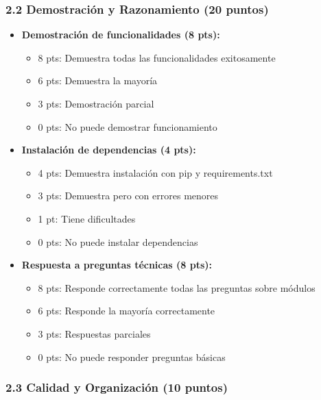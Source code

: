 \documentclass[12pt,a4paper]{article}
\begin{document}
\subsubsection{2.2 Demostración y Razonamiento (20 puntos)}

\begin{itemize}[leftmargin=*]
    \item \textbf{Demostración de funcionalidades (8 pts):}
    \begin{itemize}
        \item 8 pts: Demuestra todas las funcionalidades exitosamente
        \item 6 pts: Demuestra la mayoría
        \item 3 pts: Demostración parcial
        \item 0 pts: No puede demostrar funcionamiento
    \end{itemize}
    
    \item \textbf{Instalación de dependencias (4 pts):}
    \begin{itemize}
        \item 4 pts: Demuestra instalación con pip y requirements.txt
        \item 3 pts: Demuestra pero con errores menores
        \item 1 pt: Tiene dificultades
        \item 0 pts: No puede instalar dependencias
    \end{itemize}
    
    \item \textbf{Respuesta a preguntas técnicas (8 pts):}
    \begin{itemize}
        \item 8 pts: Responde correctamente todas las preguntas sobre módulos
        \item 6 pts: Responde la mayoría correctamente
        \item 3 pts: Respuestas parciales
        \item 0 pts: No puede responder preguntas básicas
    \end{itemize}
\end{itemize}

\subsubsection{2.3 Calidad y Organización (10 puntos)}
\end{document}
